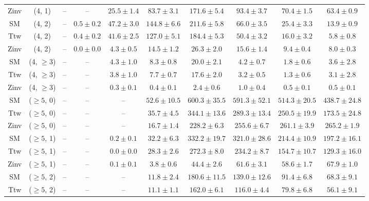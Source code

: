 \begin{table}[h!]
{\begin{tabular}{cccccccccc}
	Zinv & (4, 1) & -- & -- & $25.5\pm 1.4$ & $83.7\pm 3.1$ & $171.6\pm 5.4$ & $93.4\pm 3.7$ & $70.4\pm 1.5$ & $63.4\pm 0.9$ \\[0.5ex] 
	SM & (4, 2) & -- & $0.5\pm 0.2$ & $47.2\pm 3.0$ & $144.8\pm 6.6$ & $211.6\pm 5.8$ & $66.0\pm 3.5$ & $25.4\pm 3.3$ & $13.9\pm 0.9$ \\[0.5ex] 
	Ttw & (4, 2) & -- & $0.4\pm 0.2$ & $41.6\pm 2.5$ & $127.0\pm 5.1$ & $184.4\pm 5.3$ & $50.4\pm 3.2$ & $16.0\pm 3.2$ & $5.8\pm 0.8$ \\[0.5ex] 
	Zinv & (4, 2) & -- & $0.0\pm 0.0$ & $4.3\pm 0.5$ & $14.5\pm 1.2$ & $26.3\pm 2.0$ & $15.6\pm 1.4$ & $9.4\pm 0.4$ & $8.0\pm 0.3$ \\[0.5ex] 
	SM & (4, $\ge3$) & -- & -- & $4.3\pm 1.0$ & $8.3\pm 0.8$ & $20.0\pm 2.1$ & $4.2\pm 0.7$ & $1.8\pm 0.6$ & $3.6\pm 2.8$ \\[0.5ex] 
	Ttw & (4, $\ge3$) & -- & -- & $3.8\pm 1.0$ & $7.7\pm 0.7$ & $17.6\pm 2.0$ & $3.2\pm 0.5$ & $1.3\pm 0.6$ & $3.1\pm 2.8$ \\[0.5ex] 
	Zinv & (4, $\ge3$) & -- & -- & $0.3\pm 0.1$ & $0.4\pm 0.1$ & $2.4\pm 0.6$ & $1.0\pm 0.4$ & $0.5\pm 0.1$ & $0.5\pm 0.1$ \\[0.5ex] 
	SM & ($\ge5$, 0) & -- & -- & -- & $52.6\pm 10.5$ & $600.3\pm 35.5$ & $591.3\pm 52.1$ & $514.3\pm 20.5$ & $438.7\pm 24.8$ \\[0.5ex] 
	Ttw & ($\ge5$, 0) & -- & -- & -- & $35.7\pm 4.5$ & $344.1\pm 13.6$ & $289.3\pm 13.4$ & $250.5\pm 19.9$ & $173.5\pm 24.8$ \\[0.5ex] 
	Zinv & ($\ge5$, 0) & -- & -- & -- & $16.7\pm 1.4$ & $228.2\pm 6.3$ & $255.6\pm 6.7$ & $261.1\pm 3.9$ & $265.2\pm 1.9$ \\[0.5ex] 
	SM & ($\ge5$, 1) & -- & -- & $0.2\pm 0.1$ & $32.2\pm 6.3$ & $332.2\pm 19.7$ & $321.0\pm 28.6$ & $214.4\pm 10.9$ & $197.2\pm 16.1$ \\[0.5ex] 
	Ttw & ($\ge5$, 1) & -- & -- & $0.0\pm 0.0$ & $28.3\pm 2.6$ & $272.3\pm 8.0$ & $234.2\pm 8.7$ & $154.7\pm 10.7$ & $129.3\pm 16.0$ \\[0.5ex] 
	Zinv & ($\ge5$, 1) & -- & -- & $0.1\pm 0.1$ & $3.8\pm 0.6$ & $44.4\pm 2.6$ & $61.6\pm 3.1$ & $58.6\pm 1.7$ & $67.9\pm 1.0$ \\[0.5ex] 
	SM & ($\ge5$, 2) & -- & -- & -- & $11.8\pm 2.4$ & $180.6\pm 11.5$ & $139.0\pm 12.6$ & $91.4\pm 6.8$ & $68.3\pm 9.1$ \\[0.5ex] 
	Ttw & ($\ge5$, 2) & -- & -- & -- & $11.1\pm 1.1$ & $162.0\pm 6.1$ & $116.0\pm 4.4$ & $79.8\pm 6.8$ & $56.1\pm 9.1$ \\[0.5ex] 

\end{tabular}}
\end{table}
